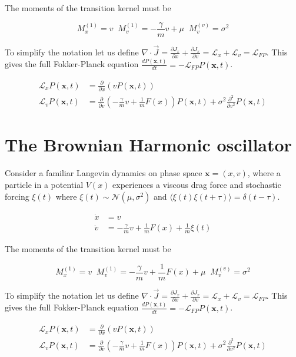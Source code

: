The moments of the transition kernel must be

\begin{equation*}
M_{x}^{(1)} = v  \;\; M_{v}^{(1)} = -\frac{\gamma}{m}v + \mu \;\; M_{v}^{(v)} = \sigma^{2}
\end{equation*}

To simplify the notation let us define $\nabla\cdot \vec{J} = \frac{\partial J_{x}}{\partial x} + \frac{\partial J_{x}}{\partial v}= \mathcal{L}_{x} + \mathcal{L}_{v} = \mathcal{L}_{FP}$. This gives the full Fokker-Planck equation $\frac{dP(\bm{x},t)}{dt} = -\mathcal{L}_{FP}P(\bm{x},t)$. 

\begin{align*}
\mathcal{L}_{x}P(\bm{x},t) &= \frac{\partial}{\partial x}\left(vP(\bm{x},t)\right)\\
\mathcal{L}_{v}P(\bm{x},t) &= \frac{\partial}{\partial v}\left(-\frac{\gamma}{m}v + \frac{1}{m}F(x)\right)P(\bm{x},t) + \sigma^{2}\frac{\partial^{2}}{\partial v^{2}}P(\bm{x},t)
\end{align*}


\section{The Brownian Harmonic oscillator}

Consider a familiar Langevin dynamics on phase space $\bm{x} = (x,v)$, where a particle in a potential $V(x)$ experiences a viscous drag force and stochastic forcing $\xi(t)$ where $\xi(t)\sim\mathcal{N}(\mu,\sigma^{2})$ and $\langle \xi(t)\xi(t+\tau)\rangle = \delta(t-\tau)$. 

\begin{align*}
\dot{x} &= v\\
\dot{v} &= -\frac{\gamma}{m}v + \frac{1}{m}F(x) + \frac{1}{m}\xi(t)
\end{align*}

The moments of the transition kernel must be

\begin{equation*}
M_{x}^{(1)} = v  \;\; M_{v}^{(1)} = -\frac{\gamma}{m}v + \frac{1}{m}F(x) + \mu \;\; M_{v}^{(v)} = \sigma^{2}
\end{equation*}

To simplify the notation let us define $\nabla\cdot \vec{J} = \frac{\partial J_{x}}{\partial x} + \frac{\partial J_{x}}{\partial v}= \mathcal{L}_{x} + \mathcal{L}_{v} = \mathcal{L}_{FP}$. This gives the full Fokker-Planck equation $\frac{dP(\bm{x},t)}{dt} = -\mathcal{L}_{FP}P(\bm{x},t)$. 

\begin{align*}
\mathcal{L}_{x}P(\bm{x},t) &= \frac{\partial}{\partial x}\left(vP(\bm{x},t)\right)\\
\mathcal{L}_{v}P(\bm{x},t) &= \frac{\partial}{\partial v}\left(-\frac{\gamma}{m}v + \frac{1}{m}F(x)\right)P(\bm{x},t) + \sigma^{2}\frac{\partial^{2}}{\partial v^{2}}P(\bm{x},t)
\end{align*}
